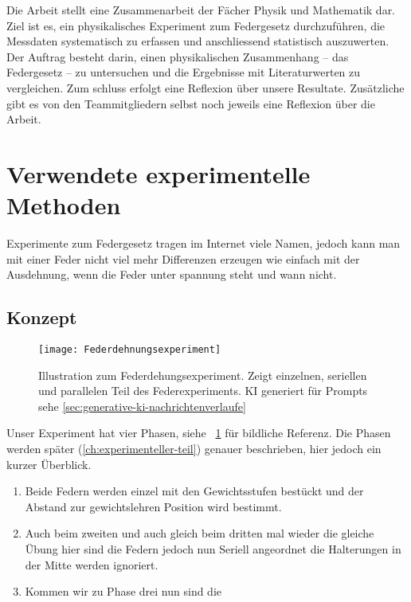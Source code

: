 \documentclass[../main.tex]{subfiles} %
\begin{document}
        Die Arbeit stellt eine Zusammenarbeit der Fächer Physik und Mathematik dar.
        Ziel ist es, ein physikalisches Experiment zum Federgesetz durchzuführen, die Messdaten systematisch zu erfassen und anschliessend statistisch auszuwerten.
        Der Auftrag besteht darin, einen physikalischen Zusammenhang – das Federgesetz – zu untersuchen und die Ergebnisse mit Literaturwerten zu vergleichen.
        Zum schluss erfolgt eine Reflexion über unsere Resultate.
        Zusätzliche gibt es von den Teammitgliedern selbst noch jeweils eine Reflexion über die Arbeit.


    \section{Verwendete experimentelle Methoden}\label{sec:verwendete-experimentelle-methoden}

        Experimente zum Federgesetz tragen im Internet viele Namen, jedoch kann man mit einer Feder nicht viel mehr Differenzen
        erzeugen wie einfach mit der Ausdehnung, wenn die Feder unter spannung steht und wann nicht.

        \subsection{Konzept}\label{subsec:konzept}

            \begin{figure}[h]
                \centering
                \texttt{[image: Federdehnungsexperiment]}
                \caption{Illustration zum Federdehungsexperiment. Zeigt einzelnen, seriellen und parallelen Teil des Federexperiments. KI generiert für Prompts sehe \ref{sec:generative-ki-nachrichtenverlaufe}}
                \label{fig:mesh1}
            \end{figure}

            Unser Experiment hat vier Phasen, siehe ~\ref{fig:mesh1} für bildliche Referenz.
            Die Phasen werden später (\ref{ch:experimenteller-teil}) genauer beschrieben, hier jedoch ein kurzer Überblick.
            \begin{enumerate}
                \item Beide Federn werden einzel mit den Gewichtsstufen bestückt und der Abstand zur gewichtslehren Position wird bestimmt.
                \item Auch beim zweiten und auch gleich beim dritten mal wieder die gleiche Übung hier sind die Federn jedoch nun Seriell angeordnet die Halterungen in der Mitte werden ignoriert.
                \item Kommen wir zu Phase drei nun sind die
            \end{enumerate}
\end{document}
